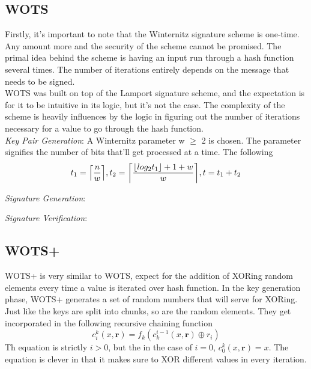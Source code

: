 \documentclass[]{scrartcl}
\DeclarePairedDelimiter\ceil{\lceil}{\rceil}
\begin{document}
\subsection*{WOTS}
Firstly, it's important to note that the Winternitz signature scheme is one-time. Any amount more and the security of the scheme cannot be promised. The primal idea behind the scheme is having an input run through a hash function several times. The number of iterations entirely depends on the message that needs to be signed.\\
WOTS was built on top of the Lamport signature scheme, and the expectation is for it to be intuitive in its logic, but it's not the case. The complexity of the scheme is heavily influences by the logic in figuring out the number of iterations necessary for a value to go through the hash function.\\
\textit{Key Pair Generation}: A Winternitz parameter w $\geq$ 2 is chosen. The parameter signifies the number of bits that'll get processed at a time. The following 
\begin{equation}
t_{1} = \ceil*{\frac{n}{w}}, t_{2} = \ceil*{\frac{\lfloor log_2{t_{1}} \rfloor + 1 + w}{w}} , t = t_{1} + t_{2}
\end{equation}

\textit{Signature Generation}: 

\textit{Signature Verification}: 

\subsection*{WOTS+}
WOTS+ is very similar to WOTS, expect for the addition of XORing random elements every time a value is iterated over hash function. In the key generation phase, WOTS+ generates a set of random numbers that will serve for XORing. Just like the keys are split into chunks, so are the random elements. They get incorporated in the following recursive chaining function
\begin{equation}
c_{i}^{k}(x,\textbf{r}) = f_{k}(c_{k}^{i-1}(x,\textbf{r}) \oplus r_{i})
\end{equation}
Th equation is strictly $i > 0$, but the in the case of $i = 0$, $c_{0}^{k}(x,\textbf{r}) = x$. The equation is clever in that it makes sure to XOR different values in every iteration. 
\end{document}
